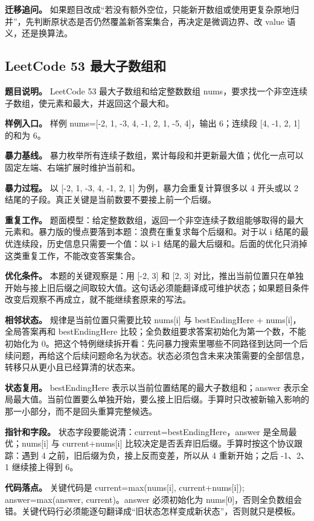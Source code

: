 \textbf{迁移追问。} 如果题目改成“若没有额外空位，只能新开数组或使用更复杂原地归并”，先判断原状态是否仍然覆盖新答案集合，再决定是微调边界、改 value 语义，还是换算法。

\subsection{LeetCode 53 最大子数组和}

\textbf{题目说明。} LeetCode 53 最大子数组和给定整数数组 nums，要求找一个非空连续子数组，使元素和最大，并返回这个最大和。

\textbf{样例入口。} 样例 nums=[-2, 1, -3, 4, -1, 2, 1, -5, 4]，输出 6；连续段 [4, -1, 2, 1] 的和为 6。

\textbf{暴力基线。} 暴力枚举所有连续子数组，累计每段和并更新最大值；优化一点可以固定左端、右端扩展时维护当前和。

\textbf{暴力过程。} 以 [-2, 1, -3, 4, -1, 2, 1] 为例，暴力会重复计算很多以 4 开头或以 2 结尾的子段。真正关键是当前数要不要接上前一个后缀。

\textbf{重复工作。} 题面模型：给定整数数组，返回一个非空连续子数组能够取得的最大元素和。暴力版的慢点要落到本题：浪费在重复求每个后缀和。对于以 i 结尾的最优连续段，历史信息只需要一个值：以 i-1 结尾的最大后缀和。后面的优化只消掉这类重复工作，不能改变答案集合。

\textbf{优化条件。} 本题的关键观察是：用 [-2, 3] 和 [2, 3] 对比，推出当前位置只在单独开始与接上旧后缀之间取较大值。这句话必须能翻译成可维护状态；如果题目条件改变后观察不再成立，就不能继续套原来的写法。

\textbf{相邻状态。} 规律是当前位置只需要比较 nums[i] 与 bestEndingHere + nums[i]，全局答案再和 bestEndingHere 比较；全负数组要求答案初始化为第一个数，不能初始化为 0。把这个特例继续拆开看：先问暴力搜索里哪些不同路径到达同一个后续问题，再给这个后续问题命名为状态。状态必须包含未来决策需要的全部信息，转移只从更小且已经算清的状态来。

\textbf{状态复用。} bestEndingHere 表示以当前位置结尾的最大子数组和；answer 表示全局最大值。当前位置要么单独开始，要么接上旧后缀。手算时只改被新输入影响的那一小部分，而不是回头重算完整候选。

\textbf{指针和字段。} 状态字段要能说清：current=bestEndingHere，answer 是全局最优；nums[i] 与 current+nums[i] 比较决定是否丢弃旧后缀。手算时按这个协议跟踪：遇到 4 之前，旧后缀为负，接上反而变差，所以从 4 重新开始；之后 -1、2、1 继续接上得到 6。

\textbf{代码落点。} 关键代码是 current=max(nums[i], current+nums[i]); answer=max(answer, current)。answer 必须初始化为 nums[0]，否则全负数组会错。关键代码行必须能逐句翻译成“旧状态怎样变成新状态”，否则就只是模板。

